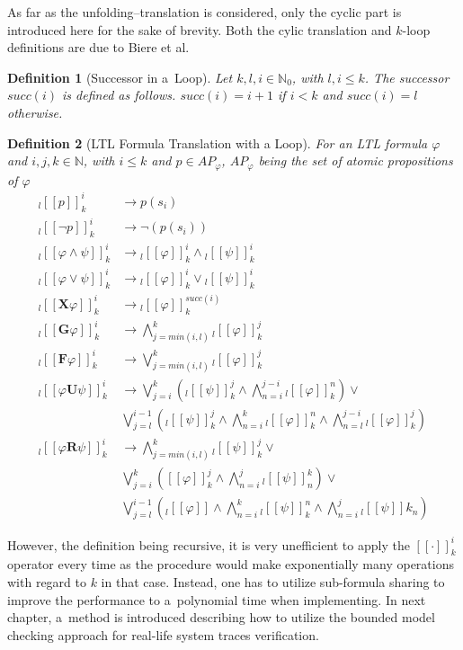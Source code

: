 \documentclass[12pt,oneside,draft]{fithesis}
\newcommand{\mNatural}{\mathbb{N}}
\newcommand{\bF}{\mathbf{F}}
\newcommand{\bG}{\mathbf{G}}
\newcommand{\bX}{\mathbf{X}}
\newcommand{\bU}{\mathbf{U}}
\newcommand{\bR}{\mathbf{R}}
\newtheorem{mydef}{Definition}
\begin{document}
As far as the unfolding--translation is considered, only the cyclic part
is introduced here for the sake of brevity.
Both the cylic translation and $k$-loop definitions are due to Biere
et al.
\begin{mydef}[Successor in a~Loop]
Let $k,l,i\in\mNatural_0$, with $l,i \leq k$. The successor $succ(i)$ is
defined as follows. $succ(i)=i+1$ if $i<k$ and $succ(i)=l$ otherwise.
\end{mydef}
\begin{mydef}[LTL Formula Translation with a Loop]
For an LTL formula $\varphi$ and $i,j,k\in\mNatural$, with $i\leq k$ and
$p\in {AP}_\varphi$, ${AP}_\varphi$ being the set of atomic propositions
of $\varphi$
\begin{align}
	{}_l[[p]]_k^i&\rightarrow p(s_i)\\
	{}_l[[\neg p]]_k^i&\rightarrow\neg(p(s_i))\\
	{}_l[[\varphi\wedge\psi]]_k^i&\rightarrow
		{}_l[[\varphi]]_k^i\wedge{}_l[[\psi]]_k^i\\
	{}_l[[\varphi\vee\psi]]_k^i&\rightarrow
		{}_l[[\varphi]]_k^i\vee{}_l[[\psi]]_k^i\\
	{}_l[[\bX\varphi]]_k^i&\rightarrow{}_l[[\varphi]]_k^{succ(i)}\\
	{}_l[[\bG\varphi]]_k^i&\rightarrow\bigwedge_{j=min(i,l)}^k
		{}_l[[\varphi]]_k^j\\
	{}_l[[\bF\varphi]]_k^i&\rightarrow\bigvee_{j=min(i,l)}^k
		{}_l[[\varphi]]_k^j\\
	{}_l[[\varphi\bU\psi]]_k^i&\rightarrow\bigvee_{j=i}^k\left(
		{}_l[[\psi]]_k^j\wedge\bigwedge_{n=i}^{j-i}{}_l[[\varphi]]_k^n
		\right)\vee\nonumber\\
		&\bigvee_{j=l}^{i-1}\left({}_l[[\psi]]_k^j\wedge\bigwedge_{n=i}^k
		{}_l[[\varphi]]_k^n\wedge\bigwedge_{n=l}^{j-i}
		{}_l[[\varphi]]_k^j\right)\\
	{}_l[[\varphi\bR\psi]]_k^i&\rightarrow\bigwedge_{j=min(i,l)}^k
		{}_l[[\psi]]_k^j\vee\nonumber\\
		&\bigvee_{j=i}^k\left([[\varphi]]_k^j\wedge\bigwedge_{n=i}^j
		{}_l[[\psi]]_n^k\right)\vee\nonumber\\
		&\bigvee_{j=l}^{i-1}\left({}_l[[\varphi]]\wedge\bigwedge_{n=i}^k
		{}_l[[\psi]]_k^n\wedge\bigwedge_{n=i}^j{}_l[[\psi]]k_n\right)
\end{align} 
\end{mydef}
However, the definition being recursive, it is very unefficient to
apply the $[[\cdot]]_k^i$ operator every time as the procedure would
make exponentially many operations with regard to $k$ in that case.
Instead, one has to utilize sub-formula sharing to improve the
performance to a~polynomial time when implementing\cite{biere}. In next
chapter, a~method is introduced describing how to utilize the bounded
model checking approach for real-life system traces verification.
\end{document}
